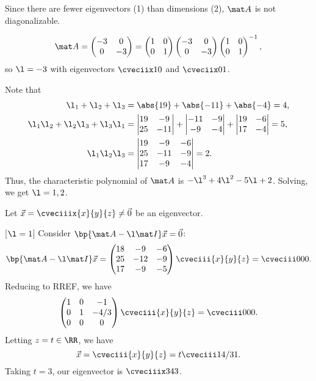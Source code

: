 \begin{solution}
\begin{ppart}
        Since there are fewer eigenvectors (1) than dimensions (2), $\mat A$ is not diagonalizable.
    \end{ppart}
    \begin{ppart}
        \[\mat A = \begin{pmatrix}-3 & 0 \\ 0 & -3\end{pmatrix} = \begin{pmatrix}1 & 0 \\ 0 & 1\end{pmatrix} \begin{pmatrix}-3 & 0 \\ 0 & -3\end{pmatrix} \begin{pmatrix}1 & 0 \\ 0 & 1\end{pmatrix}^{-1},\] so $\l = -3$ with eigenvectors $\cveciix10$ and $\cveciix01$.
    \end{ppart}
    \begin{ppart}
        Note that
        \begin{align*}
            \l_1 + \l_2 + \l_3 &= \abs{19} + \abs{-11} + \abs{-4} = 4,\\
            \l_1 \l_2 + \l_2 \l_3 + \l_3 \l_1 &= \begin{vmatrix}19 & -9 \\ 25 & -11\end{vmatrix} + \begin{vmatrix}-11 & -9 \\ -9 & -4\end{vmatrix} + \begin{vmatrix}19 & -6 \\ 17 & -4\end{vmatrix} = 5,\\
            \l_1 \l_2 \l_3 &= \begin{vmatrix}19 & -9 & -6 \\ 25 & -11 & -9 \\ 17 & -9 & -4\end{vmatrix} = 2.
        \end{align*}
        Thus, the characteristic polynomial of $\mat A$ is $-\l^3 + 4\l^2 - 5\l + 2$. Solving, we get $\l = 1, 2$.

        Let $\vec x = \cveciiix{x}{y}{z} \neq \vec 0$ be an eigenvector.

        [$\l = 1$] Consider $\bp{\mat A - \l \mat I} \vec x = \vec 0$: \[\bp{\mat A - \l \mat I} \vec x = \begin{pmatrix}18 & -9 & -6 \\ 25 & -12 & -9 \\ 17 & -9 & -5\end{pmatrix} \cveciii{x}{y}{z} = \cveciii000.\] Reducing to RREF, we have \[\begin{pmatrix}1 & 0 & -1 \\ 0 & 1 & -4/3 \\ 0 & 0 & 0\end{pmatrix} \cveciii{x}{y}{z} = \cveciii000.\] Letting $z = t \in \RR$, we have \[\vec x = \cveciii{x}{y}{z} = t\cveciii1{4/3}{1}.\] Taking $t = 3$, our eigenvector is $\cveciiix343$.


\end{ppart}
\end{solution}
